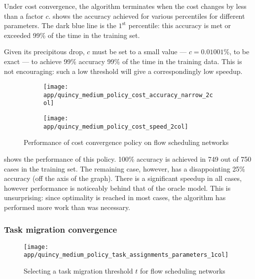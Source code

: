 Under cost convergence, the algorithm terminates when the cost changes by less than a factor $c$.  shows the accuracy achieved for various percentiles for different parameters. The dark blue line is the $1^{\mathrm{st}}$ percentile: this accuracy is met or exceeded 99\% of the time in the training set. 

Given its precipitous drop, $c$ must be set to a small value --- $c = 0.01001\%$, to be exact --- to achieve 99\% accuracy 99\% of the time in the training data. This is not encouraging: such a low threshold will give a correspondingly low speedup. 

\begin{figure}
    \begin{widepage}
        \begin{subfigure}[c]{0.5\textwidth}
            \texttt{[image: app/quincy\_medium\_policy\_cost\_accuracy\_narrow\_2col]}
        \end{subfigure}
        \begin{subfigure}[c]{0.5\textwidth}
            \texttt{[image: app/quincy\_medium\_policy\_cost\_speed\_2col]}
        \end{subfigure}
    \end{widepage}
    \caption{Performance of cost convergence policy on flow scheduling networks}
    \label{fig:app-quincy-medium-cost-cdf}
\end{figure}

 shows the performance of this policy. 100\% accuracy is achieved in 749 out of 750 cases in the training set. The remaining case, however, has a disappointing 25\% accuracy (off the axis of the graph). There is a significant speedup in all cases, however performance is noticeably behind that of the oracle model. This is unsurprising: since optimality is reached in most cases, the algorithm has performed more work than was necessary.

\subsubsection{Task migration convergence}

\begin{figure}
    \centering
    \texttt{[image: app/quincy\_medium\_policy\_task\_assignments\_parameters\_1col]}
    \caption{Selecting a task migration threshold $t$ for flow scheduling networks}
    \label{fig:app-quincy-medium-task-assignment-parameters}
\end{figure}

